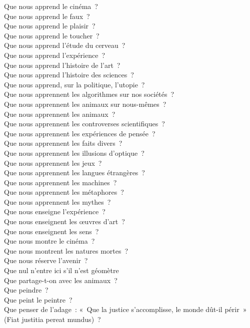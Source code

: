 \documentclass[a4paper,12pt]{article}
\begin{document}
Que nous apprend le cinéma ? \\
Que nous apprend le faux ? \\
Que nous apprend le plaisir ? \\
Que nous apprend le toucher ? \\
Que nous apprend l'étude du cerveau ? \\
Que nous apprend l'expérience ? \\
Que nous apprend l'histoire de l'art ? \\
Que nous apprend l'histoire des sciences ? \\
Que nous apprend, sur la politique, l'utopie ? \\
Que nous apprennent les algorithmes sur nos sociétés ? \\
Que nous apprennent les animaux sur nous-mêmes ? \\
Que nous apprennent les animaux ? \\
Que nous apprennent les controverses scientifiques ? \\
Que nous apprennent les expériences de pensée ? \\
Que nous apprennent les faits divers ? \\
Que nous apprennent les illusions d'optique ? \\
Que nous apprennent les jeux ? \\
Que nous apprennent les langues étrangères ? \\
Que nous apprennent les machines ? \\
Que nous apprennent les métaphores ? \\
Que nous apprennent les mythes ? \\
Que nous enseigne l'expérience ? \\
Que nous enseignent les œuvres d'art ? \\
Que nous enseignent les sens ? \\
Que nous montre le cinéma ? \\
Que nous montrent les natures mortes ? \\
Que nous réserve l'avenir ? \\
Que nul n'entre ici s'il n'est géomètre \\
Que partage-t-on avec les animaux ? \\
Que peindre ? \\
Que peint le peintre ? \\
Que penser de l'adage : « Que la justice s'accomplisse, le monde dût-il périr » (Fiat justitia pereat mundus) ? \\
\end{document}
